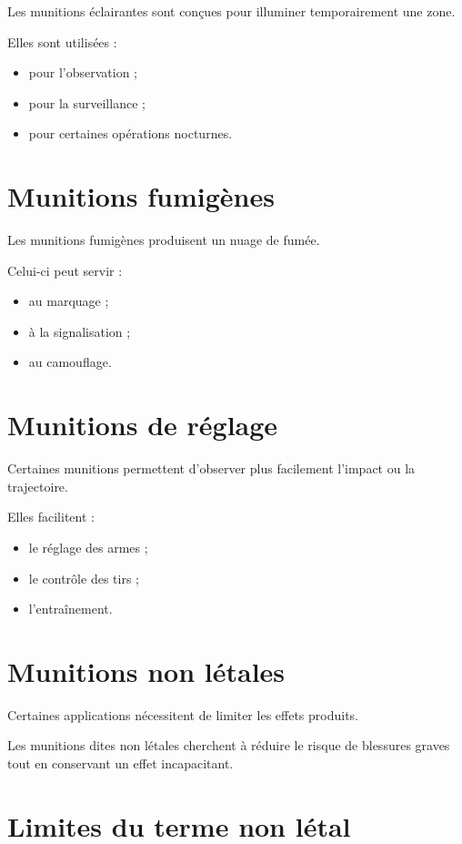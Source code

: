 Les munitions éclairantes sont conçues pour illuminer temporairement une zone.

Elles sont utilisées :

\begin{itemize}
    \item pour l'observation ;
    \item pour la surveillance ;
    \item pour certaines opérations nocturnes.
\end{itemize}

\section{Munitions fumigènes}

Les munitions fumigènes produisent un nuage de fumée.

Celui-ci peut servir :

\begin{itemize}
    \item au marquage ;
    \item à la signalisation ;
    \item au camouflage.
\end{itemize}

\section{Munitions de réglage}

Certaines munitions permettent d'observer plus facilement l'impact ou la
trajectoire.

Elles facilitent :

\begin{itemize}
    \item le réglage des armes ;
    \item le contrôle des tirs ;
    \item l'entraînement.
\end{itemize}

\section{Munitions non létales}

Certaines applications nécessitent de limiter les effets produits.

Les munitions dites non létales cherchent à réduire le risque de blessures
graves tout en conservant un effet incapacitant.

\section{Limites du terme non létal}

